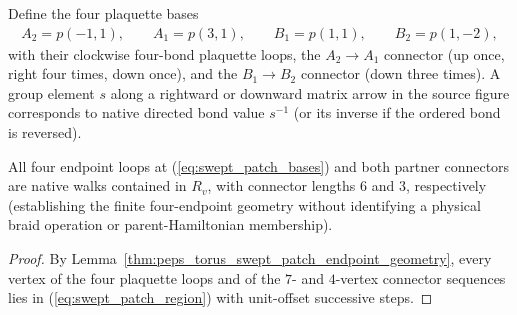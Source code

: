 \begin{definition}
    \label{def:peps_torus_swept_patch_endpoint_walks}
    \leanok
    Define the four plaquette bases
    \begin{align}
        A_2=p(-1,1),\qquad A_1=p(3,1),\qquad
        B_1=p(1,1),\qquad B_2=p(1,-2), \label{eq:swept_patch_bases}
    \end{align}
    with their clockwise four-bond plaquette loops, the $A_2\to A_1$ connector (up once, right four times, down once), and the $B_1\to B_2$ connector (down three times).
    A group element $s$ along a rightward or downward matrix arrow in the source figure corresponds to native directed bond value $s^{-1}$ (or its inverse if the ordered bond is reversed).
\end{definition}

\begin{lemma}
    \label{thm:peps_torus_swept_patch_endpoint_walks}
    \leanok
    All four endpoint loops at (\ref{eq:swept_patch_bases}) and both partner connectors are native walks contained in $R_v$, with connector lengths $6$ and $3$, respectively (establishing the finite four-endpoint geometry without identifying a physical braid operation or parent-Hamiltonian membership).
\end{lemma}
\begin{proof}\leanok
    By Lemma~\ref{thm:peps_torus_swept_patch_endpoint_geometry}, every vertex of the four plaquette loops and of the $7$- and $4$-vertex connector sequences lies in (\ref{eq:swept_patch_region}) with unit-offset successive steps.
\end{proof}

